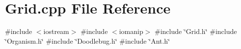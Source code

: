 \section{Grid.\+cpp File Reference}
\label{Grid_8cpp}
{\ttfamily \#include $<$iostream$>$}\newline
{\ttfamily \#include $<$iomanip$>$}\newline
{\ttfamily \#include \char`\"{}Grid.\+h\char`\"{}}\newline
{\ttfamily \#include \char`\"{}Organism.\+h\char`\"{}}\newline
{\ttfamily \#include \char`\"{}Doodlebug.\+h\char`\"{}}\newline
{\ttfamily \#include \char`\"{}Ant.\+h\char`\"{}}\newline
